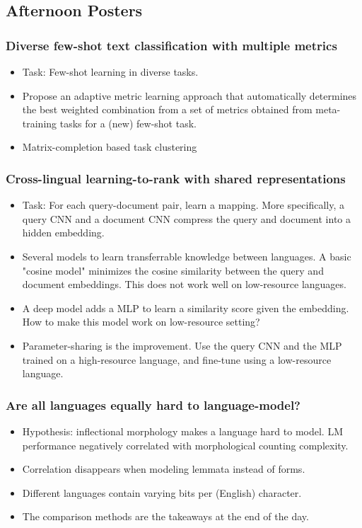 \subsection{Afternoon Posters}
\subsubsection{Diverse few-shot text classification with multiple metrics \cite{Yu2018Diverse}}
\begin{itemize}
	\item Task: Few-shot learning in diverse tasks.
	\item Propose an adaptive metric learning approach that automatically determines the best weighted combination from a set of metrics obtained from meta-training tasks for a (new) few-shot task.
	\item Matrix-completion based task clustering
\end{itemize}

\subsubsection{Cross-lingual learning-to-rank with shared representations \cite{Sasaki2018Cross-Lingual}}
\begin{itemize}
	\item Task: For each query-document pair, learn a mapping. More specifically, a query CNN and a document CNN compress the query and document into a hidden embedding.
	\item Several models to learn transferrable knowledge between languages. A basic "cosine model" minimizes the cosine similarity between the query and document embeddings. This does not work well on low-resource languages.
	\item A deep model adds a MLP to learn a similarity score given the embedding. How to make this model work on low-resource setting?
	\item Parameter-sharing is the improvement. Use the query CNN and the MLP trained on a high-resource language, and fine-tune using a low-resource language.
\end{itemize}


\subsubsection{Are all languages equally hard to language-model? \cite{Cotterell2018Are}}
\begin{itemize}
	\item Hypothesis: inflectional morphology makes a language hard to model. LM performance negatively correlated with morphological counting complexity.
	\item Correlation disappears when modeling lemmata instead of forms.
	\item Different languages contain varying bits per (English) character.
	\item The comparison methods are the takeaways at the end of the day.
\end{itemize}


